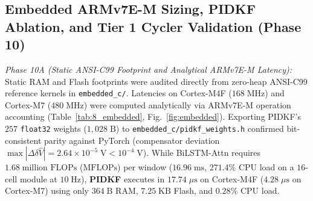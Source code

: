 \documentclass[10pt,a4paper]{article}
\providecommand{\upmu}{\mu}
\begin{document}
\subsection{Embedded ARMv7E-M Sizing, PIDKF Ablation, and Tier 1 Cycler Validation (Phase 10)\label{sec:hw_profiling}}
\emph{Phase 10A (Static ANSI-C99 Footprint and Analytical ARMv7E-M Latency):} Static RAM and Flash footprints were audited directly from zero-heap ANSI-C99 reference kernels in \texttt{embedded\_c/}. Latencies on Cortex-M4F ($168\;\mathrm{MHz}$) and Cortex-M7 ($480\;\mathrm{MHz}$) were computed analytically via ARMv7E-M operation accounting (Table~\ref{tab:8_embedded}, Fig.~\ref{fig:embedded}). Exporting PIDKF's $257$ \texttt{float32} weights ($1,028\;\mathrm{B}$) to \texttt{embedded\_c/\allowbreak pidkf\_weights.h} confirmed bit-consistent parity against PyTorch (compensator deviation $\max|\Delta\delta\hat{V}| = 2.64\times 10^{-5}\;\mathrm{V} < 10^{-4}\;\mathrm{V}$). While BiLSTM-Attn requires $1.68\;\text{million FLOPs}$ ($\text{MFLOPs}$) per window ($16.96\;\mathrm{ms}$, $271.4\%$ CPU load on a $16$-cell module at $10\;\mathrm{Hz}$), \textbf{PIDKF} executes in $17.74\;\upmu\mathrm{s}$ on Cortex-M4F ($4.28\;\upmu\mathrm{s}$ on Cortex-M7) using only $364\;\mathrm{B}$ RAM, $7.25\;\mathrm{KB}$ Flash, and $0.28\%$ CPU load.
\end{document}

